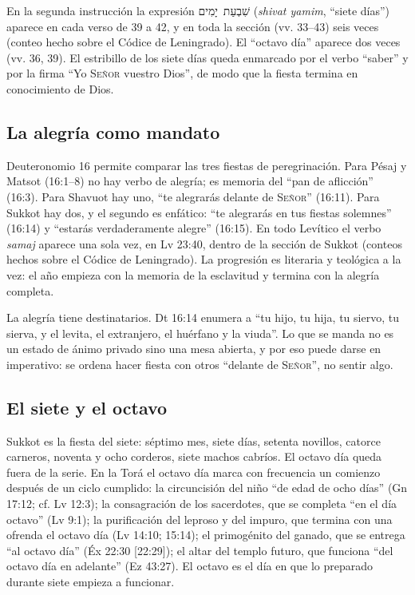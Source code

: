 \documentclass[11pt,letterpaper]{article}
\newcommand{\heb}[1]{\mbox{\foreignlanguage{hebrew}{#1}}}
\newcommand{\SENOR}{\textsc{Señor}}
\begin{document}
En la segunda instrucción la expresión \heb{שִׁבְעַת יָמִים} (\emph{shivat yamim}, ``siete días'') aparece en cada verso de 39 a 42, y en toda la sección (vv. 33--43) seis veces (conteo hecho sobre el Códice de Leningrado). El ``octavo día'' aparece dos veces (vv. 36, 39). El estribillo de los siete días queda enmarcado por el verbo ``saber'' y por la firma ``Yo \SENOR{} vuestro Dios'', de modo que la fiesta termina en conocimiento de Dios.

\subsection{La alegría como mandato}
Deuteronomio 16 permite comparar las tres fiestas de peregrinación. Para Pésaj y Matsot (16:1--8) no hay verbo de alegría; es memoria del ``pan de aflicción'' (16:3). Para Shavuot hay uno, ``te alegrarás delante de \SENOR'' (16:11). Para Sukkot hay dos, y el segundo es enfático: ``te alegrarás en tus fiestas solemnes'' (16:14) y ``estarás verdaderamente alegre'' (16:15). En todo Levítico el verbo \emph{samaj} aparece una sola vez, en Lv 23:40, dentro de la sección de Sukkot (conteos hechos sobre el Códice de Leningrado). La progresión es literaria y teológica a la vez: el año empieza con la memoria de la esclavitud y termina con la alegría completa.

La alegría tiene destinatarios. Dt 16:14 enumera a ``tu hijo, tu hija, tu siervo, tu sierva, y el levita, el extranjero, el huérfano y la viuda''. Lo que se manda no es un estado de ánimo privado sino una mesa abierta, y por eso puede darse en imperativo: se ordena hacer fiesta con otros ``delante de \SENOR'', no sentir algo.

\subsection{El siete y el octavo}
Sukkot es la fiesta del siete: séptimo mes, siete días, setenta novillos, catorce carneros, noventa y ocho corderos, siete machos cabríos. El octavo día queda fuera de la serie. En la Torá el octavo día marca con frecuencia un comienzo después de un ciclo cumplido: la circuncisión del niño ``de edad de ocho días'' (Gn 17:12; cf. Lv 12:3); la consagración de los sacerdotes, que se completa ``en el día octavo'' (Lv 9:1); la purificación del leproso y del impuro, que termina con una ofrenda el octavo día (Lv 14:10; 15:14); el primogénito del ganado, que se entrega ``al octavo día'' (Éx 22:30 [22:29]); el altar del templo futuro, que funciona ``del octavo día en adelante'' (Ez 43:27). El octavo es el día en que lo preparado durante siete empieza a funcionar.
\end{document}
